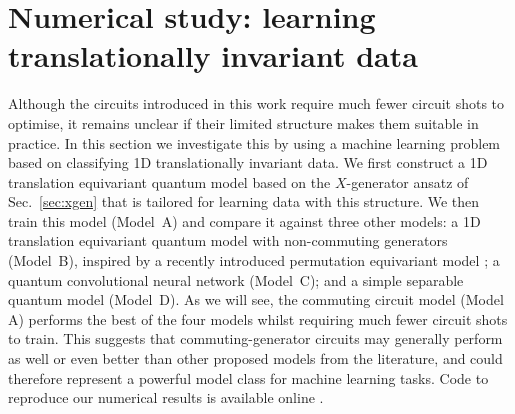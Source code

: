 \documentclass[a4paper,twocolumn,11pt,accepted=2025-09-06]{quantumarticle}
\begin{document}
\section{Numerical study: learning translationally invariant data}\label{sec:numerics}
Although the circuits introduced in this work require much fewer circuit shots to optimise, it remains unclear if their limited structure makes them suitable in practice. In this section we investigate this by using a machine learning problem based on classifying 1D translationally invariant data. We first construct a 1D translation equivariant quantum model based on the $X$-generator ansatz of Sec.\ \ref{sec:xgen} that is tailored for learning data with this structure. We then train this model (Model~A) and compare it against three other models: a 1D translation equivariant quantum model with non-commuting generators (Model~B), inspired by a recently introduced permutation equivariant model \cite{schatzki2022theoretical}; a quantum convolutional neural network \cite{qconv,hur2022quantum} (Model~C); and a simple separable quantum model (Model~D). As we will see, the commuting circuit model (Model A) performs the best of the four models whilst requiring much fewer circuit shots to train. This suggests that commuting-generator circuits may generally perform as well or even better than other proposed models from the literature, and could therefore represent a powerful model class for machine learning tasks. Code to reproduce our numerical results is available online \cite{backpropscalingrepo}.
\end{document}
